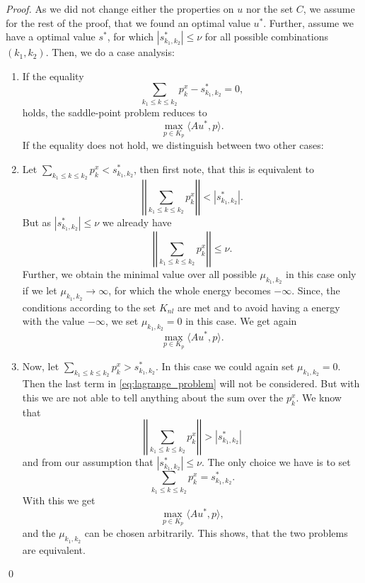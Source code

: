     \begin{proof}
        As we did not change either the properties on $u$ nor the set $C$, we assume for the rest of the proof, that we found an optimal value $u^{\ast}$. Further, assume we have a optimal value $s^{\ast}$, for which $|s^{\ast}_{k_{1}, k_{2}}| \le \nu$ for all possible combinations $(k_{1}, k_{2})$. Then, we do a case analysis:
        \begin{enumerate}
            \item If the equality
                $$
                    \sum_{k_{1} \le k \le k_{2}} p^{x}_{k} - s^{\ast}_{k_{1}, k_{2}} = 0,
                $$
            holds, the saddle-point problem reduces to
                $$
                    \max_{p \in K_{p}} \langle Au^{\ast}, p \rangle.
                $$
            If the equality does not hold, we distinguish between two other cases:
            \item Let $\sum\limits_{k_{1} \le k \le k_{2}} p^{x}_{k} < s^{\ast}_{k_{1}, k_{2}}$, then first note, that this is equivalent to
                $$
                    \left|\left|\sum_{k_{1} \le k \le k_{2}} p^{x}_{k}\right|\right| < |s^{\ast}_{k_{1}, k_{2}}|.
                $$
            But as $|s^{\ast}_{k_{1}, k_{2}}| \le \nu$ we already have
                $$
                    \left|\left|\sum_{k_{1} \le k \le k_{2}} p^{x}_{k}\right|\right| \le \nu.
                $$
            Further, we obtain the minimal value over all possible $\mu_{k_{1}, k_{2}}$ in this case only if we let $\mu_{k_{1}, k_{2}} \longrightarrow \infty$, for which the whole energy becomes $-\infty$. Since, the conditions according to the set $K_{nl}$ are met and to avoid having a energy with the value $-\infty$, we set $\mu_{k_{1}, k_{2}} = 0$ in this case. We get again
                $$
                    \max_{p \in K_{p}} \langle Au^{\ast}, p \rangle.
                $$
            \item Now, let $\sum\limits_{k_{1} \le k \le k_{2}} p^{x}_{k} > s^{\ast}_{k_{1}, k_{2}}$. In this case we could again set $\mu_{k_{1}, k_{2}} = 0$. Then the last term in \ref{eq:lagrange_problem} will not be considered. But with this we are not able to tell anything about the sum over the $p^{x}_{k}$. We know that
                $$
                    \left|\left|\sum_{k_{1} \le k \le k_{2}} p^{x}_{k}\right|\right| > |s^{\ast}_{k_{1}, k_{2}}|
                $$
            and from our assumption that $|s^{\ast}_{k_{1}, k_{2}}| \le \nu$. The only choice we have is to set
                $$
                    \sum_{k_{1} \le k \le k_{2}} p^{x}_{k} = s^{\ast}_{k_{1}, k_{2}}.
                $$
            With this we get
                $$
                    \max_{p \in K_{p}} \langle Au^{\ast}, p \rangle,
                $$
            and the $\mu_{k_{1}, k_{2}}$ can be chosen arbitrarily. This shows, that the two problems are equivalent.
        \end{enumerate}\qed
    \end{proof}


